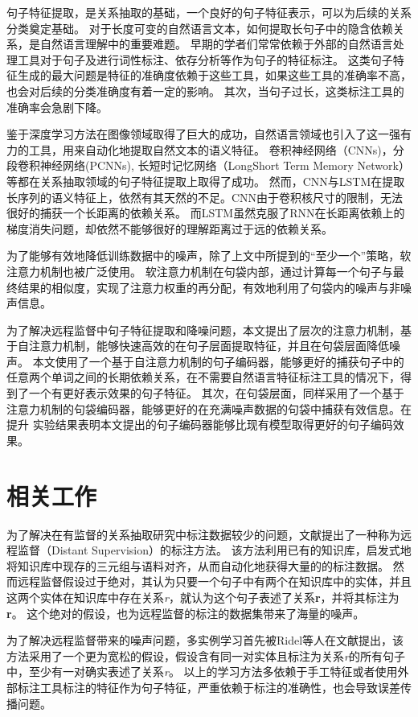 \documentclass[UTF8]{csoarticle}
\begin{document}
句子特征提取，是关系抽取的基础，一个良好的句子特征表示，可以为后续的关系分类奠定基础。
对于长度可变的自然语言文本，如何提取长句子中的隐含依赖关系，是自然语言理解中的重要难题。
早期的学者们常常依赖于外部的自然语言处理工具对于句子及进行词性标注、依存分析等作为句子的特征标注。
这类句子特征生成的最大问题是特征的准确度依赖于这些工具，如果这些工具的准确率不高，也会对后续的分类准确度有着一定的影响。
其次，当句子过长，这类标注工具的准确率会急剧下降。

鉴于深度学习方法在图像领域取得了巨大的成功，自然语言领域也引入了这一强有力的工具，用来自动化地提取自然文本的语义特征。
卷积神经网络（CNNs)，分段卷积神经网络(PCNNs), 长短时记忆网络（LongShort Term Memory Network） 等都在关系抽取领域的句子特征提取上取得了成功。
然而，CNN与LSTM在提取长序列的语义特征上，依然有其天然的不足。CNN由于卷积核尺寸的限制，无法很好的捕获一个长距离的依赖关系。
而LSTM虽然克服了RNN在长距离依赖上的梯度消失问题，却依然不能够很好的理解距离过于远的依赖关系。

为了能够有效地降低训练数据中的噪声，除了上文中所提到的“至少一个”策略，软注意力机制也被广泛使用。
软注意力机制在句袋内部，通过计算每一个句子与最终结果的相似度，实现了注意力权重的再分配，有效地利用了句袋内的噪声与非噪声信息。

为了解决远程监督中句子特征提取和降噪问题，本文提出了层次的注意力机制，基于自注意力机制，能够快速高效的在句子层面提取特征，并且在句袋层面降低噪声。
本文使用了一个基于自注意力机制的句子编码器，能够更好的捕获句子中的任意两个单词之间的长期依赖关系，在不需要自然语言特征标注工具的情况下，得到了一个有更好表示效果的句子特征。
其次，在句袋层面，同样采用了一个基于注意力机制的句袋编码器，能够更好的在充满噪声数据的句袋中捕获有效信息。在提升
实验结果表明本文提出的句子编码器能够比现有模型取得更好的句子编码效果。

\section{相关工作}
为了解决在有监督的关系抽取研究中标注数据较少的问题，文献\cite{bib1}提出了一种称为远程监督（Distant Supervision）的标注方法。
该方法利用已有的知识库，启发式地将知识库中现存的三元组与语料对齐，从而自动化地获得大量的的标注数据。
然而远程监督假设过于绝对，其认为只要一个句子中有两个在知识库中的实体，并且这两个实体在知识库中存在关系\textit{r}，就认为这个句子表述了关系\textbf{r}，并将其标注为\textbf{r}。
这个绝对的假设，也为远程监督的标注的数据集带来了海量的噪声。

为了解决远程监督带来的噪声问题，多实例学习首先被Ridel等人在文献\cite{bib2}提出，该方法采用了一个更为宽松的假设，假设含有同一对实体且标注为关系\textit{r}的所有句子中，至少有一对确实表述了关系\textit{r}。
以上的学习方法多依赖于手工特征或者使用外部标注工具标注的特征作为句子特征，严重依赖于标注的准确性，也会导致误差传播问题。
\end{document}
